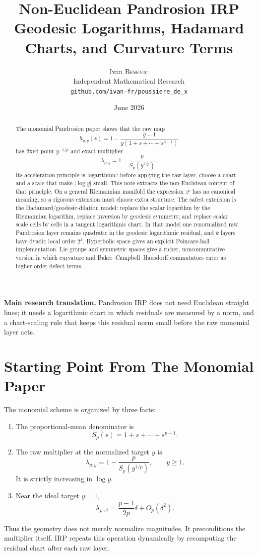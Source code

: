 \documentclass[10pt,a4paper]{article}
\title{\bfseries Non-Euclidean Pandrosion IRP\\[-0.1em]
\large Geodesic Logarithms, Hadamard Charts, and Curvature Terms}
\author{Ivan \textsc{Besevic}\\[-0.2em]
\small Independent Mathematical Research\\[-0.2em]
\small \texttt{github.com/ivan-fr/poussiere\_de\_x}}
\date{June 2026}
\theoremstyle{plain}
\theoremstyle{definition}
\theoremstyle{remark}
\newenvironment{takeaway}{%
  \begin{center}\begin{minipage}{0.92\linewidth}\small\itshape\color{blue!45!black}%
}{%
  \end{minipage}\end{center}%
}
\begin{document}
\maketitle

\begin{abstract}
The monomial Pandrosion paper shows that the raw map
\[
  h_{p,y}(s)=1-\frac{y-1}{y(1+s+\cdots+s^{p-1})}
\]
has fixed point $y^{-1/p}$ and exact multiplier
\[
  \lambda_{p,y}=1-\frac{p}{S_p(y^{1/p})}.
\]
Its acceleration principle is logarithmic: before applying the raw layer, choose
a chart and a scale that make $|\log y|$ small.  This note extracts the
non-Euclidean content of that principle.  On a general Riemannian manifold the
expression $z^p$ has no canonical meaning, so a rigorous extension must choose
extra structure.  The safest extension is the Hadamard/geodesic-dilation model:
replace the scalar logarithm by the Riemannian logarithm, replace inversion by
geodesic symmetry, and replace scalar scale cells by cells in a tangent
logarithmic chart.  In that model one renormalized raw Pandrosion layer remains
quadratic in the geodesic logarithmic residual, and $k$ layers have dyadic local
order $2^k$.  Hyperbolic space gives an explicit Poincare-ball implementation.
Lie groups and symmetric spaces give a richer, noncommutative version in which
curvature and Baker--Campbell--Hausdorff commutators enter as higher-order
defect terms.
\end{abstract}

\begin{takeaway}
\textbf{Main research translation.}
Pandrosion IRP does not need Euclidean straight lines; it needs a logarithmic
chart in which residuals are measured by a norm, and a chart-scaling rule that
keeps this residual norm small before the raw monomial layer acts.
\end{takeaway}

\section{Starting Point From The Monomial Paper}

The monomial scheme is organized by three facts:
\begin{enumerate}
  \item The proportional-mean denominator is
  \[
    S_p(s)=1+s+\cdots+s^{p-1}.
  \]
  \item The raw multiplier at the normalized target $y$ is
  \[
    \lambda_{p,y}
      =1-\frac{p}{S_p(y^{1/p})},
      \qquad y\ge 1.
  \]
  It is strictly increasing in $\log y$.
  \item Near the ideal target $y=1$,
  \[
    \lambda_{p,e^\delta}
      =\frac{p-1}{2p}\delta+O_p(\delta^2).
  \]
\end{enumerate}
Thus the geometry does not merely normalize magnitudes.  It preconditions the
multiplier itself.  IRP repeats this operation dynamically by recomputing the
residual chart after each raw layer.
\end{document}

